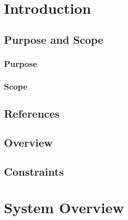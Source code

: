 \documentclass[11pt, a4paper]{report}
\begin{document}

\chapter{Introduction}%
\label{cha:I}


\section{Purpose and Scope}
\subsection{Purpose}


\subsection{Scope}


\section{References}


\section{Overview}

\section{Constraints}


\pagebreak


\chapter{System Overview}%
\label{cha:SO}
\end{document}
